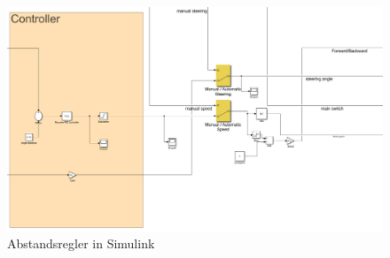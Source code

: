 \begin{figure}[h]
	\centering
	\includegraphics[width=\textwidth]{Figures/Controller.PNG}
	\caption{Abstandsregler in Simulink }
	\label{img:grafik-dummy}
\end{figure}
